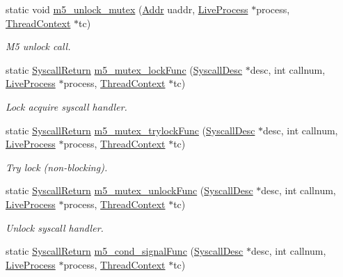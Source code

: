 \begin{DoxyCompactItemize}
static void \hyperlink{classTru64_ac965ae70992f9a6f184c1e6f177e3b5b}{m5\_\-unlock\_\-mutex} (\hyperlink{base_2types_8hh_af1bb03d6a4ee096394a6749f0a169232}{Addr} uaddr, \hyperlink{classLiveProcess}{LiveProcess} $\ast$process, \hyperlink{classThreadContext}{ThreadContext} $\ast$tc)
\begin{DoxyCompactList}\small\item\em M5 unlock call. \item\end{DoxyCompactList}\item 
static \hyperlink{classSyscallReturn}{SyscallReturn} \hyperlink{classTru64_a5a1fd874973f006aecd51e98ce0b6579}{m5\_\-mutex\_\-lockFunc} (\hyperlink{classSyscallDesc}{SyscallDesc} $\ast$desc, int callnum, \hyperlink{classLiveProcess}{LiveProcess} $\ast$process, \hyperlink{classThreadContext}{ThreadContext} $\ast$tc)
\begin{DoxyCompactList}\small\item\em Lock acquire syscall handler. \item\end{DoxyCompactList}\item 
static \hyperlink{classSyscallReturn}{SyscallReturn} \hyperlink{classTru64_aa8d051ea34736b976895f70df5f48b9d}{m5\_\-mutex\_\-trylockFunc} (\hyperlink{classSyscallDesc}{SyscallDesc} $\ast$desc, int callnum, \hyperlink{classLiveProcess}{LiveProcess} $\ast$process, \hyperlink{classThreadContext}{ThreadContext} $\ast$tc)
\begin{DoxyCompactList}\small\item\em Try lock (non-\/blocking). \item\end{DoxyCompactList}\item 
static \hyperlink{classSyscallReturn}{SyscallReturn} \hyperlink{classTru64_a13ce77bfaa709faa1a3006cea0465959}{m5\_\-mutex\_\-unlockFunc} (\hyperlink{classSyscallDesc}{SyscallDesc} $\ast$desc, int callnum, \hyperlink{classLiveProcess}{LiveProcess} $\ast$process, \hyperlink{classThreadContext}{ThreadContext} $\ast$tc)
\begin{DoxyCompactList}\small\item\em Unlock syscall handler. \item\end{DoxyCompactList}\item 
static \hyperlink{classSyscallReturn}{SyscallReturn} \hyperlink{classTru64_acfc803d4984b3037abb896038e4f6fc1}{m5\_\-cond\_\-signalFunc} (\hyperlink{classSyscallDesc}{SyscallDesc} $\ast$desc, int callnum, \hyperlink{classLiveProcess}{LiveProcess} $\ast$process, \hyperlink{classThreadContext}{ThreadContext} $\ast$tc)

\end{DoxyCompactItemize}
